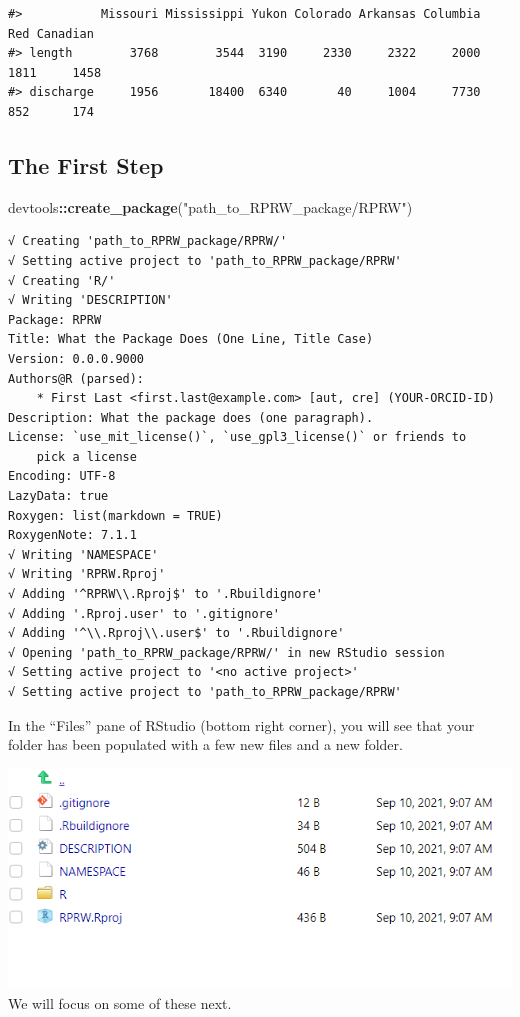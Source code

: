 \documentclass[
]{book}
\newenvironment{Shaded}{\begin{snugshade}}{\end{snugshade}}
\newcommand{\KeywordTok}[1]{\textcolor[rgb]{0.13,0.29,0.53}{\textbf{#1}}}
\newcommand{\NormalTok}[1]{#1}
\newcommand{\OperatorTok}[1]{\textcolor[rgb]{0.81,0.36,0.00}{\textbf{#1}}}
\newcommand{\StringTok}[1]{\textcolor[rgb]{0.31,0.60,0.02}{#1}}
\begin{document}
\begin{verbatim}
#>           Missouri Mississippi Yukon Colorado Arkansas Columbia  Red Canadian
#> length        3768        3544  3190     2330     2322     2000 1811     1458
#> discharge     1956       18400  6340       40     1004     7730  852      174
\end{verbatim}

\hypertarget{the-first-step}{%
\subsection{The First Step}\label{the-first-step}}

\begin{Shaded}
\begin{Highlighting}[]
\NormalTok{devtools}\OperatorTok{::}\KeywordTok{create_package}\NormalTok{(}\StringTok{"path_to_RPRW_package/RPRW"}\NormalTok{)}
\end{Highlighting}
\end{Shaded}

\begin{verbatim}
√ Creating 'path_to_RPRW_package/RPRW/'
√ Setting active project to 'path_to_RPRW_package/RPRW'
√ Creating 'R/'
√ Writing 'DESCRIPTION'
Package: RPRW
Title: What the Package Does (One Line, Title Case)
Version: 0.0.0.9000
Authors@R (parsed):
    * First Last <first.last@example.com> [aut, cre] (YOUR-ORCID-ID)
Description: What the package does (one paragraph).
License: `use_mit_license()`, `use_gpl3_license()` or friends to
    pick a license
Encoding: UTF-8
LazyData: true
Roxygen: list(markdown = TRUE)
RoxygenNote: 7.1.1
√ Writing 'NAMESPACE'
√ Writing 'RPRW.Rproj'
√ Adding '^RPRW\\.Rproj$' to '.Rbuildignore'
√ Adding '.Rproj.user' to '.gitignore'
√ Adding '^\\.Rproj\\.user$' to '.Rbuildignore'
√ Opening 'path_to_RPRW_package/RPRW/' in new RStudio session
√ Setting active project to '<no active project>'
√ Setting active project to 'path_to_RPRW_package/RPRW'
\end{verbatim}

In the ``Files'' pane of RStudio (bottom right corner), you will see that your folder has been populated with a few new files and a new folder.

\includegraphics[width=1\linewidth]{images/newrpack_files}
We will focus on some of these next.
\end{document}

